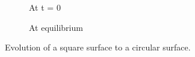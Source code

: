 \documentclass[a0,portrait]{a0poster}
\begin{document}
\begin{multicols}{3}
\begin{figure}[H]
	\centering
	\begin{subfigure}{4cm}            
		\caption{At t = 0}
		\label{Fig:surface_initial}
	\end{subfigure}
	\begin{subfigure}{4cm}
		\centering
		\caption{At equilibrium }
		\label{Fig:surface_final}
	\end{subfigure}
	\caption{Evolution of a square surface to a circular surface.}\label{fig:surface_tension}
\end{figure}


\end{multicols}
\end{document}
